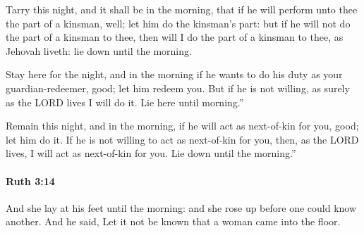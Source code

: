 			\begin{versebox}
					\item[BHS] 
					\item[LXX] 
					\item[ASV] Tarry this night, and it shall be in the morning, that if he will perform unto thee the part of a kinsman, well; let him do the kinsman's part: but if he will not do the part of a kinsman to thee, then will I do the part of a kinsman to thee, as Jehovah liveth: lie down until the morning.
					\item[NIV] Stay here for the night, and in the morning if he wants to do his duty as your guardian-redeemer, good; let him redeem you. But if he is not willing, as surely as the LORD lives I will do it. Lie here until morning.”
					\item[NRSV] Remain this night, and in the morning, if he will act as next-of-kin for you, good; let him do it. If he is not willing to act as next-of-kin for you, then, as the LORD lives, I will act as next-of-kin for you. Lie down until the morning.”
			\end{versebox}

		\paragraph{Ruth 3:14} %
			\label{RUTH-3-14}

			And she lay at his feet until the morning: and she rose up before one could know another. And he said, Let it not be known that a woman came into the floor.

